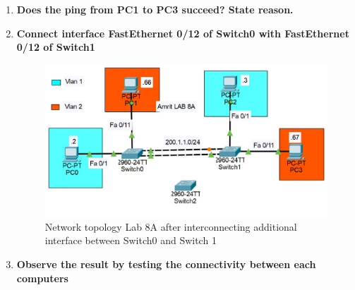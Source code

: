 \documentclass[a4paper,11pt]{article}
\begin{document}
\begin{enumerate}








    \item\textbf{ Does the ping from PC1 to PC3 succeed? State reason.}




    \item\textbf{ Connect interface FastEthernet 0/12 of Switch0 with FastEthernet 0/12 of Switch1}


          \begin{figure}[H]
              \centering
              \includegraphics[scale=0.68,cframe=blue 0.5pt 3pt]{./FIG/Lab8A7.jpg}
              \caption{Network topology Lab 8A after interconnecting additional interface between Switch0  and Switch 1 }
          \end{figure}




    \item\textbf{ Observe the result by testing the connectivity between each computers}



\end{enumerate}
\end{document}
